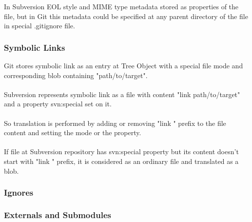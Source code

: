 In Subversion EOL style and MIME type metadata stored as properties of the file, but in Git this metadata could be specified at any parent directory of the file in special .gitignore file. 

\subsubsection{Symbolic Links}
Git stores symbolic link as an entry at Tree Object with a special file mode and corresponding blob containing "path/to/target".
\\\\
Subversion represents symbolic link as a file with content "link path/to/target" and a property svn:special set on it.
\\\\
So translation is performed by adding or removing "link " prefix to the file content and setting the mode or the property.
\\\\
If file at Subversion repository has svn:special property but its content doesn't start with "link " prefix, it is considered as an ordinary file and translated as a blob.
\subsubsection{Ignores}
\subsubsection{Externals and Submodules}
